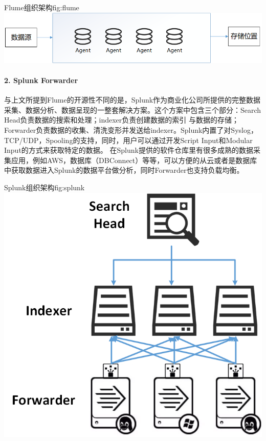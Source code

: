 \documentclass{HustGraduPaper}
\begin{document}
    \begin{generalfig}{Flume组织架构}{fig:flume}
        \includegraphics[width=\textwidth]{Figures/flume.png}
    \end{generalfig}
    \paragraph{2. Splunk Forwarder\\}
    
    与上文所提到Flume的开源性不同的是，Splunk作为商业化公司所提供的完整数据采集、数据分析、数据呈现的一整套解决方案。这个方案中包含三个部分：Search Head负责数据的搜索和处理；indexer负责创建数据的索引
    与数据的存储；Forwarder负责数据的收集、清洗变形并发送给indexer。Splunk内置了对Syslog，TCP/UDP，Spooling的支持，同时，用户可以通过开发Script Input和Modular Input的方式来获取特定的数据。
    在Splunk提供的软件仓库里有很多成熟的数据采集应用，例如AWS，数据库（DBConnect）等等，可以方便的从云或者是数据库中获取数据进入Splunk的数据平台做分析，同时Forwarder也支持负载均衡。
    
    \begin{generalfig}[htb]{Splunk组织架构}{fig:splunk} 
        \includegraphics[scale = 0.4]{Figures/splunk.png}
    \end{generalfig}
\end{document}

